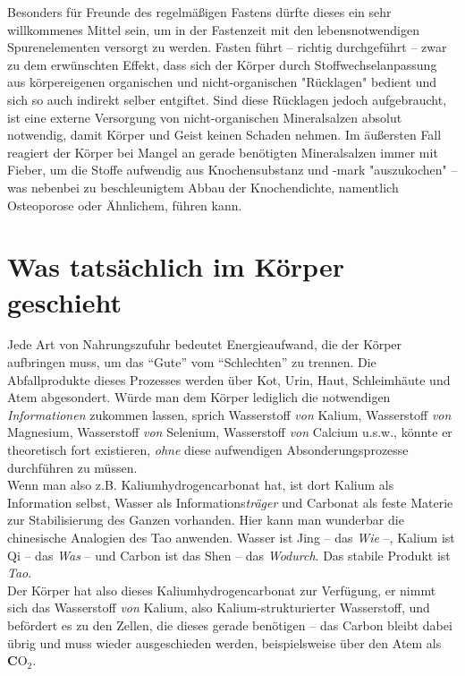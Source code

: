 \documentclass[a5paper,8pt]{scrbook}
\begin{document}
Besonders für Freunde des regelmäßigen Fastens dürfte dieses ein sehr willkommenes Mittel sein, um in der Fastenzeit mit den lebensnotwendigen Spurenelementen versorgt zu werden. Fasten führt -- richtig durchgeführt -- zwar zu dem erwünschten Effekt, dass sich der Körper durch Stoffwechselanpassung aus körpereigenen organischen und nicht-organischen "Rücklagen" bedient und sich so auch indirekt selber entgiftet. Sind diese Rücklagen jedoch aufgebraucht, ist eine externe Versorgung von nicht-organischen Mineralsalzen absolut notwendig, damit Körper und Geist keinen Schaden nehmen. Im äußersten Fall reagiert der Körper bei Mangel an gerade benötigten Mineralsalzen immer mit Fieber, um die Stoffe aufwendig aus Knochensubstanz und -mark "auszukochen" -- was nebenbei zu beschleunigtem Abbau der Knochendichte, namentlich Osteoporose oder Ähnlichem, führen kann.\\

\newpage

\section{Was tatsächlich im Körper geschieht}

Jede Art von Nahrungszufuhr bedeutet Energieaufwand, die der Körper aufbringen muss, um das ``Gute'' vom ``Schlechten'' zu trennen. Die Abfallprodukte dieses Prozesses werden über Kot, Urin, Haut, Schleimhäute und Atem abgesondert. Würde man dem Körper lediglich die notwendigen \emph{Informationen} zukommen lassen, sprich Wasserstoff \emph{von} Kalium, Wasserstoff \emph{von} Magnesium, Wasserstoff \emph{von} Selenium, Wasserstoff \emph{von} Calcium u.s.w., könnte er theoretisch fort existieren, \emph{ohne} diese aufwendigen Absonderungsprozesse durchführen zu müssen.\\

Wenn man also z.B. Kaliumhydrogencarbonat hat, ist dort Kalium als Information selbst, Wasser als Informations\emph{träger} und Carbonat als feste Materie zur Stabilisierung des Ganzen vorhanden. Hier kann man wunderbar die chinesische Analogien des Tao anwenden. Wasser ist Jing -- das \emph{Wie} --, Kalium ist Qi -- das \emph{Was} -- und Carbon ist das Shen -- das \emph{Wodurch}. Das stabile Produkt ist \emph{Tao}.\\

Der Körper hat also dieses Kaliumhydrogencarbonat zur Verfügung, er nimmt sich das Wasserstoff \emph{von} Kalium, also Kalium-strukturierter Wasserstoff, und befördert es zu den Zellen, die dieses gerade benötigen -- das Carbon bleibt dabei übrig und muss wieder ausgeschieden werden, beispielsweise über den Atem als {\bf C}O$_2$.\\
\end{document}
